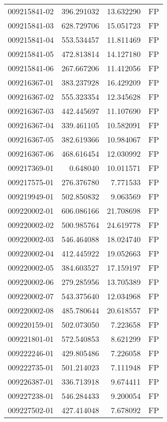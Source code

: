 \begin{tabular}{lrrl}
009215841-02 &  396.291032 &    13.632290 &   FP \\
009215841-03 &  628.729706 &    15.051723 &   FP \\
009215841-04 &  553.534457 &    11.811469 &   FP \\
009215841-05 &  472.813814 &    14.127180 &   FP \\
009215841-06 &  267.667206 &    11.412056 &   FP \\
009216367-01 &  383.237928 &    16.429209 &   FP \\
009216367-02 &  555.323354 &    12.345628 &   FP \\
009216367-03 &  442.445697 &    11.107690 &   FP \\
009216367-04 &  339.461105 &    10.582091 &   FP \\
009216367-05 &  382.619366 &    10.984067 &   FP \\
009216367-06 &  468.616454 &    12.030992 &   FP \\
009217369-01 &    0.648040 &    10.011571 &   FP \\
009217575-01 &  276.376780 &     7.771533 &   FP \\
009219949-01 &  502.850832 &     9.063569 &   FP \\
009220002-01 &  606.086166 &    21.708698 &   FP \\
009220002-02 &  500.985764 &    24.619778 &   FP \\
009220002-03 &  546.464088 &    18.024740 &   FP \\
009220002-04 &  412.445922 &    19.052663 &   FP \\
009220002-05 &  384.603527 &    17.159197 &   FP \\
009220002-06 &  279.285956 &    13.705389 &   FP \\
009220002-07 &  543.375640 &    12.034968 &   FP \\
009220002-08 &  485.780644 &    20.618557 &   FP \\
009220159-01 &  502.073050 &     7.223658 &   FP \\
009221801-01 &  572.540853 &     8.621299 &   FP \\
009222246-01 &  429.805486 &     7.226058 &   FP \\
009222735-01 &  501.214023 &     7.111948 &   FP \\
009226387-01 &  336.713918 &     9.674411 &   FP \\
009227238-01 &  546.284433 &     9.200054 &   FP \\
009227502-01 &  427.414048 &     7.678092 &   FP \\

\end{tabular}
